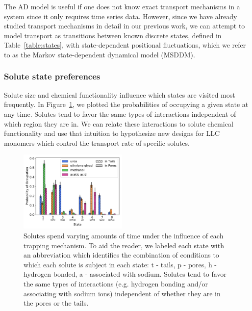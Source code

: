 \documentclass[aps,pre,preprint,groupedaddress,longbibliography]{revtex4-2}
\begin{document}
  The AD model is useful if one does not know exact transport mechanisms 
  in a system since it only requires time series data. However, since we have
  already studied transport mechanisms in detail in our previous work, we can
  attempt to model transport as transitions between known discrete
  states, defined in Table~\ref{table:states}, with state-dependent positional
  fluctuations, which we refer to as the Markov state-dependent dynamical model (MSDDM).

  \subsubsection{Solute state preferences}\label{section:state_preferences}

  Solute size and chemical functionality influence which states are visited most frequently.
  In Figure~\ref{fig:state_probabilities}, we plotted the probabilities of occupying
  a given state at any time. Solutes tend to favor the same types of interactions 
  independent of which region they are in. 
  We can relate these interactions to solute chemical functionality and use that intuition
  to hypothesize new designs for LLC monomers which control the transport rate of specific
  solutes.
  
  \begin{figure}
  \centering
  \includegraphics[width=0.475\textwidth]{state_probabilities.pdf}
  \caption{Solutes spend varying amounts of time under the influence of each
  trapping mechanism. To aid the reader, we labeled each state with an abbreviation which
  identifies the combination of conditions to which each solute is subject in each state:
  t - tails, p - pores, h - hydrogen bonded, a - associated with sodium. Solutes tend to 
  favor the same types of interactions (e.g. hydrogen bonding and/or associating with sodium
  ions) independent of whether they are in the pores or the tails.}\label{fig:state_probabilities}
  \end{figure}
\end{document}

